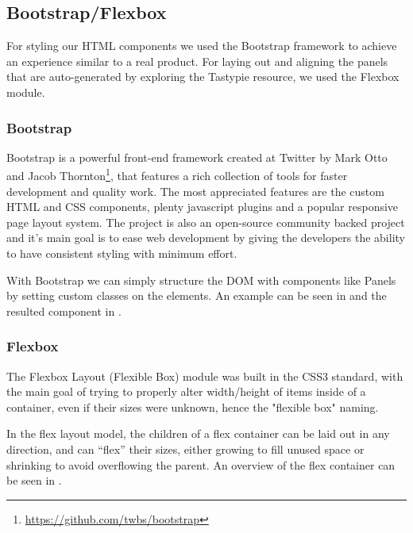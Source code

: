 \subsection{Bootstrap/Flexbox}
\label{sub-sec:bootstrap}

For styling our HTML components we used the Bootstrap framework to achieve an experience similar to a real product. For laying out and aligning the panels that are auto-generated by exploring the Tastypie resource, we used the Flexbox module. 

\subsubsection{Bootstrap}
\label{sub-sub-sec:bootstrap}

Bootstrap is a powerful front-end framework created at Twitter by Mark Otto and Jacob Thornton\footnote{\url{https://github.com/twbs/bootstrap}}, that features a rich collection of tools for faster development and quality work. The most appreciated features are the custom HTML and CSS components, plenty javascript plugins and a popular responsive page layout system. The project is also an open-source community backed project and it's main goal is to ease web development by giving the developers the ability to have consistent styling with minimum effort.

With Bootstrap we can simply structure the DOM with components like Panels by setting custom classes on the elements. An example can be seen in  and the resulted component in .





\subsubsection{Flexbox}
\label{sub-sub-sec:flexbox}

The Flexbox Layout (Flexible Box) module was built in the CSS3 standard, with the main goal of trying to properly alter width/height of items inside of a container, even if their sizes were unknown, hence the "flexible box" naming.

In the flex layout model, the children of a flex container can be laid out in any direction, and can “flex” their sizes, either growing to fill unused space or shrinking to avoid overflowing the parent\cite{flexbox}. An overview of the flex container can be seen in .

